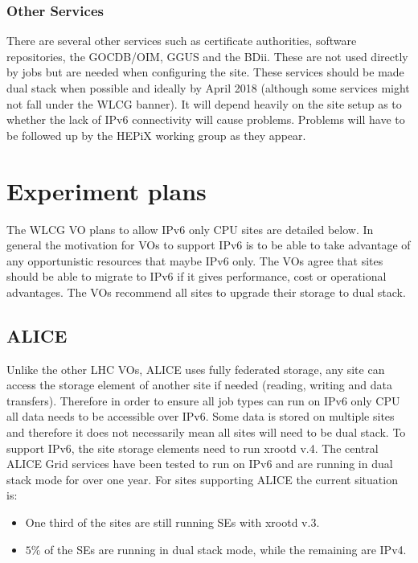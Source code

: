 \documentclass[11pt]{article}
\begin{document}
\subsubsection{Other Services}
There are several other services such as certificate authorities, software repositories, the GOCDB/OIM, GGUS and the BDii.  These are not used directly by jobs but are needed when configuring the site.  These services should be made dual stack when possible and ideally by April 2018 (although some services might not fall under the WLCG banner).   It will depend heavily on the site setup as to whether the lack of IPv6 connectivity will cause problems.  Problems will have to be followed up by the HEPiX working group as they appear. 

\section{Experiment plans}
The WLCG VO plans to allow IPv6 only CPU sites are detailed below.  In general the motivation for VOs to support IPv6 is to be able to take advantage of any opportunistic resources that maybe IPv6 only.  The VOs agree that sites should be able to migrate to IPv6 if it gives performance, cost or operational advantages.  The VOs recommend all sites to upgrade their storage to dual stack.  

\subsection{ALICE}
Unlike the other LHC VOs, ALICE uses fully federated storage, any site can access the storage element of another site if needed (reading, writing and data transfers).  Therefore in order to ensure all job types can run on IPv6 only CPU all data needs to be accessible over IPv6.  Some data is stored on multiple sites and therefore it does not necessarily mean all sites will need to be dual stack.  To support IPv6, the site storage elements need to run xrootd v.4.  The central ALICE Grid services have been tested to run on IPv6 and are running in dual stack mode for over one year.  For sites supporting ALICE the current situation is:
\begin{itemize}
\item One third of the sites are still running SEs with xrootd v.3.
\item $5\%$ of the SEs are running in dual stack mode, while the remaining are IPv4.
\end{itemize}
\end{document}
